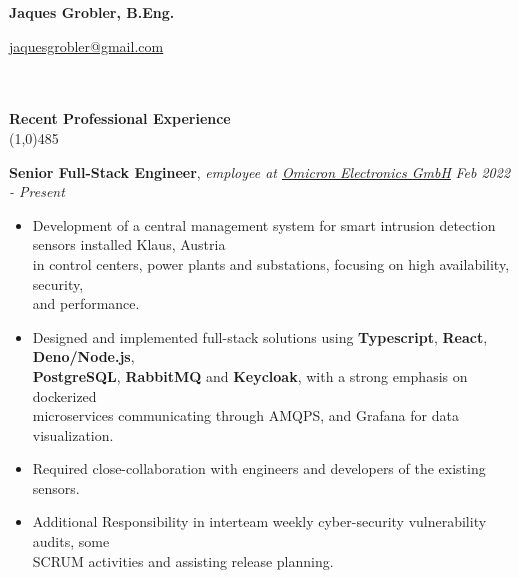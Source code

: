 \documentclass[9pt]{extarticle}
\newcommand\negativespace[1][-0.12cm]{\hspace*{#1}}
\begin{document}
\centerline{{\LARGE \bf Jaques Grobler, B.Eng.}}
\centerline{\href{mailto:jaquesgrobler@gmail.com}{jaquesgrobler@gmail.com}}


\noindent %
\\\\
\vspace*{-6pt}
{\negativespace \Large \bf Recent Professional Experience}\\
\line(1,0){485}
\\
\noindent

\noindent
{\bf Senior Full-Stack Engineer}, \textit{employee at \href{https://www.omicronenergy.com/de/}{Omicron Electronics GmbH}}  \hfill \textit{Feb 2022 - Present}
\begin{itemize}
\setlength\itemsep{0.05em}
\item Development of a central management system for smart intrusion detection sensors installed \hfill Klaus, Austria \\
in control centers, power plants and substations, focusing on high availability, security, \\
and performance.
\item Designed and implemented full-stack solutions using \textbf{Typescript}, \textbf{React}, \textbf{Deno/Node.js}, \\
\textbf{PostgreSQL}, \textbf{RabbitMQ} and \textbf{Keycloak}, with a strong emphasis on dockerized \\
microservices communicating through AMQPS, and Grafana for data visualization.
\item Required close-collaboration with engineers and developers of the existing sensors.
\item Additional Responsibility in interteam weekly cyber-security vulnerability audits, some \\
 SCRUM activities and assisting release planning.
\end{itemize}
\end{document}
